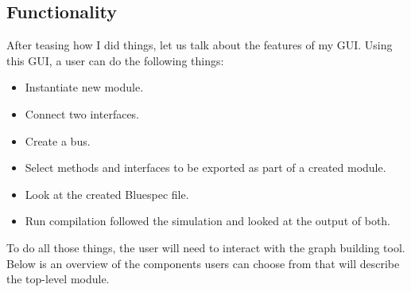 \documentclass[12pt]{report}
\begin{document}
\subsection{Functionality} 
After teasing how I did things, let us talk about the features of my GUI.  
Using this GUI, a user can do the following things:  
\begin{itemize} 
   \item Instantiate new module.  
   \item Connect two interfaces. 
   \item Create a bus. 
   \item Select methods and interfaces to be exported as part of a created module. 
   \item Look at the created Bluespec file. 
   \item Run compilation followed the simulation and looked at the output of both.  
\end{itemize} 
To do all those things, the user will need to interact with the graph building tool. Below is an overview of the components users can choose from that will describe the top-level module. 
\end{document}
